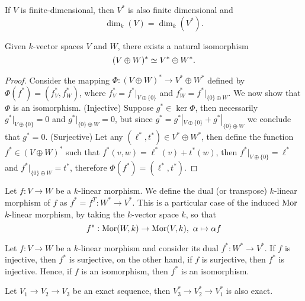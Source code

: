 \begin{proposition}
  If \(V\) is finite-dimensional, then \(V^\ast\) is also finite dimensional and
  \[
    \dim_k(V) = \dim_k (V^\ast).
  \]
\end{proposition}

\begin{proposition}
  Given \(k\)-vector spaces \(V\) and \(W\), there exists a natural isomorphism
  \[
    (V \oplus W)^\ast \simeq V^\ast \oplus W^\ast.
  \]
\end{proposition}

\begin{proof}
  Consider the mapping \(\Phi: (V \oplus W)^\ast \to V^\ast \oplus W^\ast\)
  defined by \(\Phi(f^\ast) = (f^\ast_V, f^\ast_W)\), where \(f^\ast_V =
  f^\ast|_{V \oplus \{0\}} \) and \(f^\ast_W = f^\ast|_{\{0\} \oplus W}\). We
  now show that \(\Phi\) is an isomorphism. (Injective) Suppose \(g^\ast \in
  \ker \Phi\), then necessarily \(g^\ast|_{V\oplus \{0\}} = 0\) and
  \(g^\ast|_{\{0\} \oplus W} = 0\), but since \(g^\ast = g^\ast|_{V\oplus
  \{0\}} + g^\ast|_{\{0\} \oplus W}\) we conclude that \(g^\ast = 0\).
  (Surjective) Let any \((\ell^\ast, t^\ast) \in V^\ast \oplus W^\ast\), then
  define the function \(f^\ast \in (V \oplus W)^\ast\) such that \(f^\ast(v, w)
  = \ell^\ast(v) + t^\ast(w)\), then \(f^\ast|_{V \oplus \{0\}} = \ell^\ast\)
  and \(f^\ast|_{\{0\} \oplus W} = t^\ast\), therefore \(\Phi(f^\ast) =
  (\ell^\ast, t^\ast)\).
\end{proof}

\begin{definition}
  Let \(f : V \to W\) be a \(k\)-linear morphism. We define the dual (or
  transpose) \(k\)-linear morphism of \(f\) as \(f^\ast = f^T : W^\ast \to
  V^\ast\). This is a particular case of the induced \(\operatorname{Mor}\) \(k\)-linear
  morphism, by taking the \(k\)-vector space \(k\), so that
  \[
    f^\ast : \operatorname{Mor}(W, k) \to \operatorname{Mor}(V, k),\ \alpha \mapsto \alpha  f
  \]
\end{definition}

\begin{proposition}
  Let \(f : V \to W\) be a \(k\)-linear morphism and consider its dual \(f^\ast
  : W^\ast \to V^\ast\). If \(f\) is injective, then \(f^\ast\) is surjective,
  on the other hand, if \(f\) is surjective, then \(f^\ast\) is injective.
  Hence, if \(f\) is an isomorphism, then \(f^*\) is an isomorphism.
\end{proposition}

\begin{proposition}
  Let \(V_1 \to V_2 \to V_3\) be an exact sequence, then \(V_3^\ast \to
  V_2^\ast \to V_1^\ast\) is also exact.
\end{proposition}

